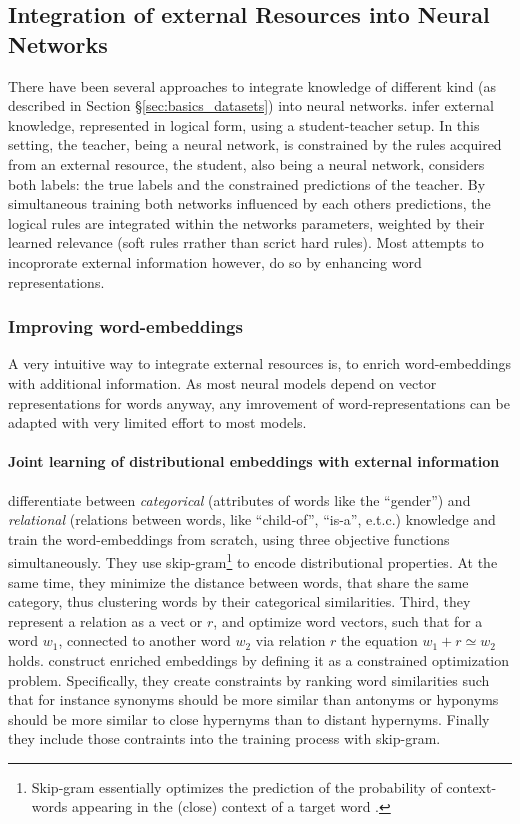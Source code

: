 \subsection{Integration of external Resources into Neural Networks}\label{sec:ext_res_in_nn}
There have been several approaches to integrate knowledge of different kind (as described in Section §\ref{sec:basics_datasets}) into neural networks. \cite{hu2016deep} infer external knowledge, represented in logical form, using a student-teacher setup. In this setting, the teacher, being a neural network, is constrained by the rules acquired from an external resource, the student, also being a neural network, considers both labels: the true labels and the constrained predictions of the teacher. By simultaneous training both networks influenced by each others predictions, the logical rules are integrated within the networks parameters, weighted by their learned relevance (soft rules rrather than scrict hard rules). Most attempts to incoprorate external information however, do so by enhancing word representations.
\subsubsection{Improving word-embeddings}\label{sec:embeddings_improvements_relwork}
A very intuitive way to integrate external resources is, to enrich word-embeddings with additional information. As most neural models depend on vector representations for words anyway, any imrovement of word-representations can be adapted with very limited effort to most models.

\paragraph*{Joint learning of distributional embeddings with external information}
\cite{xu2014rc} differentiate between \textit{categorical} (attributes of words like the ``gender'') and \textit{relational} (relations between words, like ``child-of'', ``is-a'', e.t.c.) knowledge and train the word-embeddings from scratch, using three objective functions simultaneously. They use skip-gram\footnote{Skip-gram essentially optimizes the prediction of the probability of context-words appearing in the (close) context of a target word \citep{goldberg2014word2vec}.} to encode distributional properties. At the same time, they minimize the distance between words, that share the same category, thus clustering words by their categorical similarities. Third, they represent a relation as a vect or $r$,  and optimize word vectors, such that for a word $w_1$, connected to another word $w_2$ via relation $r$ the equation $w_1 + r \simeq w_2$ holds. \cite{liu2015learning} construct enriched embeddings by defining it as a constrained optimization problem. Specifically, they create constraints by ranking word similarities such that for instance synonyms should be more similar than antonyms or hyponyms should be more similar to close hypernyms than to distant hypernyms. Finally they include those contraints into the training process with skip-gram. 
